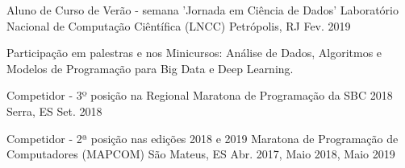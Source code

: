 

\begin{cventries}
\cventry
{Aluno de Curso de Verão - semana 'Jornada em Ciência de Dados'} %
{Laboratório Nacional de Computação Ciêntífica (LNCC)} %
{Petrópolis, RJ} %
{Fev. 2019} %
{
	\begin{cvitems} %
		\item {Participação em  palestras e nos Minicursos: Análise de Dados, Algoritmos e Modelos de Programação para Big Data e Deep Learning.}
	\end{cvitems}
}

 \cventry
{Competidor - 3º posição na Regional} %
{Maratona de Programação da SBC 2018} %
{Serra, ES} %
{Set. 2018} %
{
}

\cventry
{Competidor - 2ª posição nas edições 2018 e 2019} %
{Maratona de Programação de Computadores (MAPCOM)} %
{São Mateus, ES} %
{Abr. 2017, Maio 2018, Maio 2019} %
{
}


\end{cventries}
